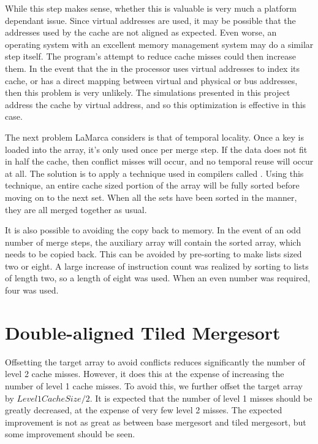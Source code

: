 While this step makes sense, whether this is valuable is very much a platform
dependant issue. Since virtual addresses are used, it may be possible that the
addresses used by the cache are not aligned as expected. Even worse, an
operating system with an excellent memory management system may do a similar
step itself. The program's attempt to reduce cache misses could then increase
them. In the event that the  in the processor uses
virtual addresses to index its cache, or has a direct mapping between virtual
and physical or bus addresses, then this problem is very unlikely. The
simulations presented in this project address the cache by virtual address, and
so this optimization is effective in this case.

The next problem LaMarca considers is that of temporal locality. Once a key is
loaded into the array, it's only used once per merge step. If the data does not
fit in half the cache, then conflict misses will occur, and no temporal reuse
will occur at all. The solution is to apply a technique used in compilers called
. Using this technique, an entire cache sized portion of the array
will be fully sorted before moving on to the next set. When all the sets have
been sorted in the manner, they are all merged together as usual.

It is also possible to avoiding the copy back to memory. In the event of an odd
number of merge steps, the auxiliary array will contain the sorted array, which
needs to be copied back. This can be avoided by pre-sorting to make lists sized
two or eight. A large increase of instruction count was realized by sorting to
lists of length two, so a length of eight was used. When an even number was
required, four was used.

\section{Double-aligned Tiled Mergesort}
\label{double-aligned tiled mergesort}
Offsetting the target array to avoid conflicts reduces significantly the number
of level 2 cache misses. However, it does this at the expense of increasing the
number of level 1 cache misses. To avoid this, we further offset the target
array by $Level1CacheSize/2$. It is expected that the number of level 1 misses
should be greatly decreased, at the expense of very few level 2 misses. The
expected improvement is not as great as between base mergesort and tiled
mergesort, but some improvement should be seen.

